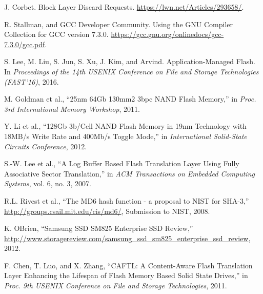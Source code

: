 \begin{thebibliography}{00}
J. Corbet.
Block Layer Discard Requests.
\url{https://lwn.net/Articles/293658/}.

R. Stallman, and GCC Developer Community.
Using the GNU Compiler Collection for GCC version 7.3.0.
\url{https://gcc.gnu.org/onlinedocs/gcc-7.3.0/gcc.pdf}.


S. Lee, M. Liu, S. Jun, S. Xu, J. Kim, and Arvind.
Application-Managed Flash.
In \textit{Proceedings of the 14th USENIX Conference on File and Storage
Technologies (FAST'16)}, 2016.


M. Goldman et al.,
``25nm 64Gb 130mm2 3bpc NAND Flash Memory,''
in \textit{Proc. 3rd International Memory Workshop}, 2011.


Y. Li et al.,
``128Gb 3b/Cell NAND Flash Memory in 19nm Technology with 18MB/s Write Rate and 400Mb/s Toggle Mode,''
in \textit{International Solid-State Circuits Conference}, 2012.


S.-W. Lee et al.,
``A Log Buffer Based Flash Translation Layer Using Fully Associative Sector Translation,''
in \textit{ACM Transactions on Embedded Computing Systems}, vol. 6, no. 3, 2007.


R.L. Rivest et al.,
``The MD6 hash function - a proposal to NIST for SHA-3,''
\url{http://groups.csail.mit.edu/cis/md6/}, Submission to NIST, 2008.

K. OBrien,
``Samsung SSD SM825 Enterprise SSD Review,''
\url{http://www.storagereview.com/samsung_ssd_sm825_enterprise_ssd_review}, 2012.

F. Chen, T. Luo, and X. Zhang, 
``CAFTL: A Content-Aware Flash Translation Layer Enhancing the Lifespan of Flash Memory Based Solid State Drives,''
in \textit{Proc. 9th USENIX Conference on File and Storage Technologies}, 2011.


\end{thebibliography}
